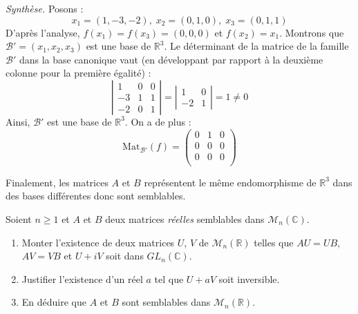 \documentclass[a4paper,10pt]{report}
\begin{document}
\noindent \textit{Synthèse.} Posons :
$$ x_1 =(1,-3,-2), \; x_2 = (0,1,0), \; x_3= (0,1,1)$$
D'après l'analyse, $f(x_1)=f(x_3)=(0,0,0)$ et $f(x_2)=x_1$. Montrons que $\mathcal{B}'=(x_1,x_2,x_3)$ est une base de $\mathbb{R}^3$. Le déterminant de la matrice de la famille $\mathcal{B}'$ dans la base canonique vaut (en développant par rapport à la deuxième colonne pour la première égalité) :
$$ \left\vert \begin{array}{ccc}
1 & 0 & 0 \\
-3 & 1 & 1 \\
-2 & 0 & 1 
\end{array}\right\vert =  \left\vert \begin{array}{cc} 1 & 0 \\
-2 & 1\end{array}\right\vert =1 \neq 0 $$
Ainsi, $\mathcal{B}'$ est une base de $\mathbb{R}^3$. On a de plus :
$$ \textrm{Mat}_{\mathcal{B}'}(f) = \begin{pmatrix}
0 & 1 & 0 \\
0 & 0 & 0 \\
0 & 0 & 0 \\
\end{pmatrix}$$

\medskip

\noindent Finalement, les matrices $A$ et $B$ représentent le même endomorphisme de $\mathbb{R}^3$ dans des bases différentes donc sont semblables.

\begin{Exa} Soient $n \geq 1$ et $A$ et $B$ deux matrices \textit{réelles} semblables dans $\mathcal{M}_n(\mathbb{C})$.

\begin{enumerate}
\item Monter l'existence de deux matrices $U$, $V$ de $\mathcal{M}_n(\mathbb{R})$ telles que $AU=UB$, $AV=VB$ et $U+iV$ soit dans $GL_n(\mathbb{C})$.
\item Justifier l'existence d'un réel $a$ tel que $U+aV$ soit inversible.
\item En déduire que $A$ et $B$ sont semblables dans $\mathcal{M}_n(\mathbb{R})$.
\end{enumerate}
\end{Exa} 
\end{document}
